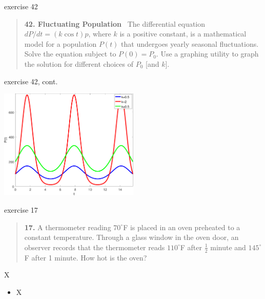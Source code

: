 \documentclass{beamer}
\begin{document}
\begin{frame}{exercise 42}

\small
\begin{quotation}
\noindent \textbf{42.  Fluctuating Population} \, The differential equation $dP/dt = (k \cos t) p$, where $k$ is a positive constant, is a mathematical model for a population $P(t)$ that undergoes yearly seasonal fluctuations.  Solve the equation subject to $P(0)=P_0$.  Use a graphing utility to graph the solution for different choices of $P_0$ [and $k$]. 
\end{quotation}

\vspace{45mm}
\end{frame}


\begin{frame}{exercise 42, cont.}

\vspace{30mm}

\hfill \includegraphics[width=0.5\textwidth]{figs/exercise-42-3-1}
\end{frame}


\begin{frame}{exercise 17}

\small
\begin{quotation}
\noindent \textbf{17.} A thermometer reading $70^\circ$F is placed in an oven preheated to a constant temperature.  Through a glass window in the oven door, an observer records that the thermometer reads $110^\circ$F after $\frac{1}{2}$ minute and $145^\circ$F after 1 minute.  How hot is the oven?
\end{quotation}

\vspace{50mm}
\end{frame}


\begin{frame}{X}

\begin{itemize}
\item X
\end{itemize}
\end{frame}
\end{document}
